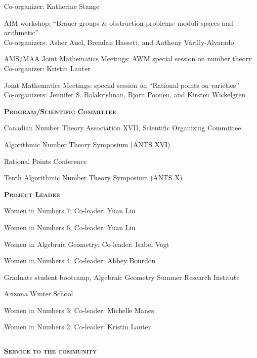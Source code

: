 \documentclass[12pt]{article}
\newcommand{\sectionheading}[1]
	{\bigskip %
	\noindent
	\hspace{-6.5mm}\textcolor{Gray}{\rule[.75mm]{21.5mm}{1mm}} %
	\hspace{.2mm}	%
	{\large{\textbf{\textsc{#1}}}} %
}
\newenvironment{date_section}
	{
	\vspace{-1ex}
	\leftmargini = 15ex
	 \begin{itemize}[
		 labelsep = *,
		 labelwidth = 9ex,
		 labelindent = 0ex,
		 itemindent = !,
		 font=\normalfont, 
		 align=parleft
		 ]
		{}
		\itemsep=-1.5mm}
	{\end{itemize}\vspace{-2ex}}
\newcommand{\yearmo}[2]{
	\item[ 
		{\makebox[1ex][r]{#1}}
		\hspace{1ex}
		{\makebox[1ex][l]{#2} }
		] }
\newcommand{\yearrange}[2]{
	\item[ 
		{\makebox[1ex][r]{#1}}
		--
		{\makebox[1ex][l]{#2} }
		] }
\begin{document}
\begin{date_section}
				Co-organizer: Katherine Stange
			\yearmo{}{2013}%
				AIM workshop: 
					``Brauer groups \& obstruction problems: 
						moduli spaces and arithmetic''\\
				Co-organizers: Asher Auel, Brendan Hassett, and Anthony V\'arilly-Alvarado
			\yearmo{}{}%
				AMS/MAA Joint Mathematics Meetings: AWM special session on number theory\\
				Co-organizer: Kristin Lauter 
			\yearmo{}{2012}%
				Joint Mathematics Meetings: special session on 
				``Rational points on varieties''\\
				Co-organizers: Jennifer S. Balakrishnan, Bjorn Poonen, and Kirsten Wickelgren
	
			\yearmo{}{}\textbf{\textsc{Program/Scientific Committee}}
			\yearmo{}{2027} Canadian Number Theory Association XVII, Scientific Organizing Committee
			\yearmo{}{2024} Algorithmic Number Theory Symposium (ANTS XVI)
            \yearrange{2022}{} Rational Points Conference
			\yearmo{}{2012}%
				Tenth Algorithmic Number Theory Symposium (ANTS X)

			\yearmo{}{}\textbf{\textsc{Project Leader}}
			\yearmo{}{2026}%
				Women in Numbers 7; 
				Co-leader: Yuan Liu
			\yearmo{}{2023}%
				Women in Numbers 6; 
				Co-leader: Yuan Liu
			\yearmo{}{2020}%
				Women in Algebraic Geometry; 
				Co-leader: Isabel Vogt
			\yearmo{}{2017}%
				Women in Numbers 4; 
				Co-leader: Abbey Bourdon
			\yearmo{}{2015}
				Graduate student bootcamp, Algebraic Geometry Summer Research Institute
			\yearmo{}{}
				Arizona Winter School
			\yearmo{}{2014}%
				Women in Numbers 3; 
				Co-leader: Michelle Manes
			\yearmo{}{2011}%
				Women in Numbers 2;
				Co-leader: Kristin Lauter
	
		\end{date_section}

	\sectionheading{Service to the community}%
\end{document}
